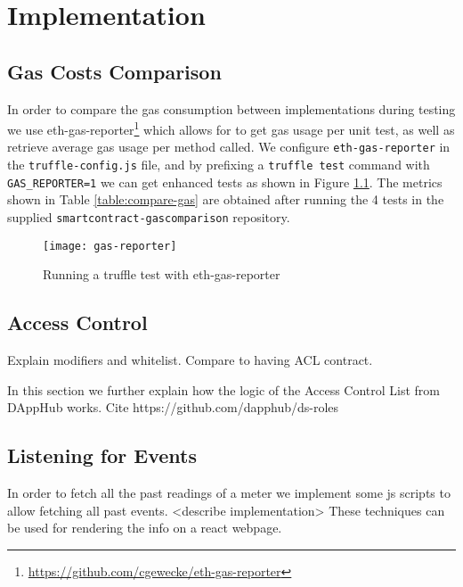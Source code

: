 \chapter{Implementation}

\section{Gas Costs Comparison}

In order to compare the gas consumption between implementations during testing we use eth-gas-reporter\footnote{\url{https://github.com/cgewecke/eth-gas-reporter}} which allows for to get gas usage per unit test, as well as retrieve average gas usage per method called. We configure \texttt{eth-gas-reporter} in the \texttt{truffle-config.js} file, and by prefixing a \texttt{truffle test} command with \texttt{GAS\_REPORTER=1} we can get enhanced tests as shown in Figure \ref{fig:gas-reporter}. The metrics shown in Table \ref{table:compare-gas} are obtained after running the 4 tests in the supplied \texttt{smartcontract-gascomparison} repository.

\begin{figure}[htb]
    \centering
    \texttt{[image: gas-reporter]}
    \caption{Running a truffle test with eth-gas-reporter}
    \label{fig:gas-reporter}
\end{figure}

\section{Access Control}\label{apx:implementation:acl}
Explain modifiers and whitelist. Compare to having ACL contract.

In this section we further explain how the logic of the Access Control List from DAppHub works. Cite  https://github.com/dapphub/ds-roles

\section{Listening for Events} \label{apx:implementation:events}

In order to fetch all the past readings of a meter we implement some js scripts to allow fetching all past events. <describe implementation>
These techniques can be used for rendering the info on a react webpage.
